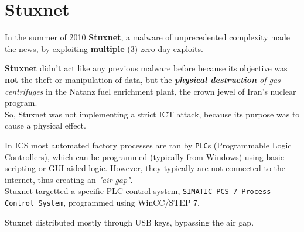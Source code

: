 \chapter{Stuxnet}

In the summer of 2010 \textbf{Stuxnet}, a malware of unprecedented complexity made the
news, by exploiting \textbf{multiple} (3) zero-day exploits.

\textbf{Stuxnet} didn’t act like any previous malware before because its objective was \textbf{not} the theft or manipulation of data,
but the \textit{\textbf{physical destruction} of gas centrifuges} in the Natanz fuel
enrichment plant, the crown jewel of Iran’s nuclear program.\\
So, Stuxnet was not implementing a strict ICT attack, because its purpose was to cause a physical effect.

In ICS most automated factory processes are ran by \texttt{PLC}s (Programmable Logic Controllers),
which can be programmed (typically from Windows) using basic scripting or GUI-aided logic.
However, they typically are not connected to the internet, thus creating an \textit{"air-gap"}.\\
Stuxnet targetted a specific PLC control system, \texttt{SIMATIC PCS 7 Process Control System}, programmed using WinCC/STEP 7.

Stuxnet distributed mostly through USB keys, bypassing the air gap.